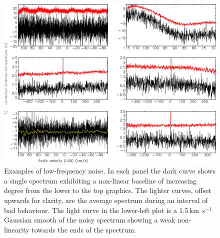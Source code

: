 \documentclass[a4paper,fleqn,usenatbib]{mnras}
\begin{document}
\begin{figure}
\includegraphics[width=\textwidth]{examples_non-linear_baselines}
\caption{Examples of low-frequency noise.  In each panel the
  dark curve shows a single spectrum exhibiting a non-linear baseline
  of increasing degree from the lower to the top graphics.  The
  lighter curves, offset upwards for clarity, are the average spectrum
  during an interval of bad behaviour.  The light curve in the lower-left plot is a
  1.5\,km~s$^{-1}$ Gaussian smooth of the noisy spectrum showing a
  weak non-linearity towards the ends of the spectrum.}
\label{fig:badbase:interference}
\end{figure}
\end{document}
